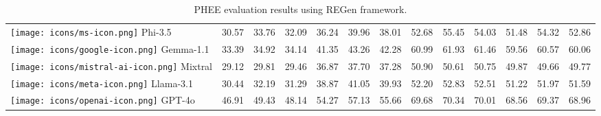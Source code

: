 \begin{table*}[h!]
\begin{tabular}{l|ccc|ccc|ccc|ccc}
\texttt{[image: icons/ms-icon.png]} Phi-3.5 & 30.57 & 33.76 & 32.09 & 36.24 & 39.96 & 38.01 & 52.68 & 55.45 & 54.03 & 51.48 & 54.32 & 52.86 \\
\texttt{[image: icons/google-icon.png]} Gemma-1.1 & 33.39 & 34.92 & 34.14 & 41.35 & 43.26 & 42.28 & 60.99 & 61.93 & 61.46 & 59.56 & 60.57 & 60.06 \\
\texttt{[image: icons/mistral-ai-icon.png]} Mixtral & 29.12 & 29.81 & 29.46 & 36.87 & 37.70 & 37.28 & 50.90 & 50.61 & 50.75 & 49.87 & 49.66 & 49.77 \\
\texttt{[image: icons/meta-icon.png]} Llama-3.1 & 30.44 & 32.19 & 31.29 & 38.87 & 41.05 & 39.93 & 52.20 & 52.83 & 52.51 & 51.22 & 51.97 & 51.59\\
\texttt{[image: icons/openai-icon.png]} GPT-4o & 46.91 & 49.43 & 48.14 & 54.27 & 57.13 & 55.66 & 69.68 & 70.34 & 70.01 & 68.56 & 69.37 & 68.96 \\

\bottomrule 
\end{tabular}
\caption{PHEE evaluation results using REGen framework.}
\label{PHEE-all-results}
\end{table*}


